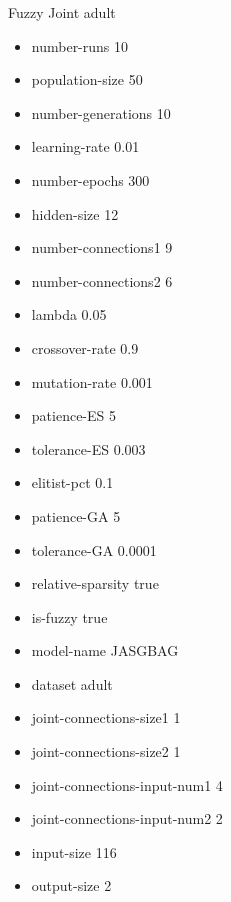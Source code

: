 Fuzzy Joint
adult
\begin{itemize}
\item number-runs 10
\item population-size 50
\item number-generations 10
\item learning-rate 0.01
\item number-epochs 300
\item hidden-size 12
\item number-connections1 9
\item number-connections2 6
\item lambda 0.05
\item crossover-rate 0.9
\item mutation-rate 0.001
\item patience-ES 5
\item tolerance-ES 0.003
\item elitist-pct 0.1
\item patience-GA 5
\item tolerance-GA 0.0001
\item relative-sparsity true
\item is-fuzzy true
\item model-name JASGBAG
\item dataset adult
\item joint-connections-size1 1
\item joint-connections-size2 1
\item joint-connections-input-num1 4
\item joint-connections-input-num2 2
\item input-size 116
\item output-size 2
\end{itemize}

